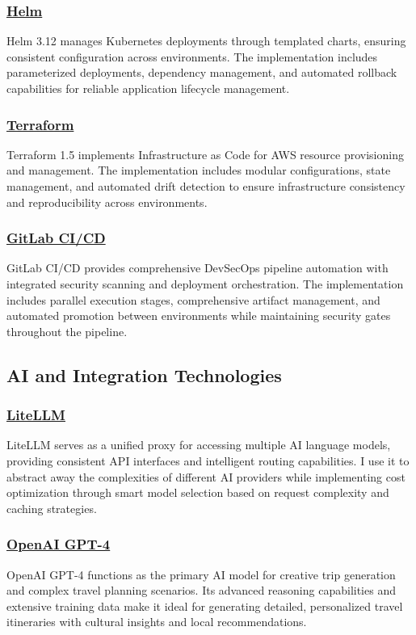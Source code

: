 \subsubsection*{\underline{Helm}}
Helm 3.12 manages Kubernetes deployments through templated charts, ensuring consistent configuration across environments. The implementation includes parameterized deployments, dependency management, and automated rollback capabilities for reliable application lifecycle management.

\subsubsection*{\underline{Terraform}}
Terraform 1.5 implements Infrastructure as Code for AWS resource provisioning and management. The implementation includes modular configurations, state management, and automated drift detection to ensure infrastructure consistency and reproducibility across environments.

\subsubsection*{\underline{GitLab CI/CD}}
GitLab CI/CD provides comprehensive DevSecOps pipeline automation with integrated security scanning and deployment orchestration. The implementation includes parallel execution stages, comprehensive artifact management, and automated promotion between environments while maintaining security gates throughout the pipeline.

\subsection{AI and Integration Technologies}

\subsubsection*{\underline{LiteLLM}}
LiteLLM serves as a unified proxy for accessing multiple AI language models, providing consistent API interfaces and intelligent routing capabilities. I use it to abstract away the complexities of different AI providers while implementing cost optimization through smart model selection based on request complexity and caching strategies.

\subsubsection*{\underline{OpenAI GPT-4}}
OpenAI GPT-4 functions as the primary AI model for creative trip generation and complex travel planning scenarios. Its advanced reasoning capabilities and extensive training data make it ideal for generating detailed, personalized travel itineraries with cultural insights and local recommendations.

